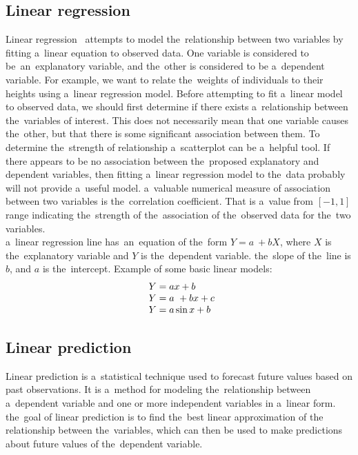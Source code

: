         \subsection{Linear regression}\label{sec:linear}
        Linear regression~\cite{Levinson} attempts to model the~relationship between two variables by fitting a~linear
        equation to observed data. One variable is considered to be~an~explanatory variable, and the~other is
        considered to be a~dependent variable. For example, we want to relate the~weights of individuals to their
        heights using a~linear regression model. Before attempting to fit a~linear model to observed data, we should
        first determine if there exists a~relationship between the~variables of interest. This does not necessarily
        mean that one variable causes the~other, but that there is some significant association between them.
        To determine the~strength of relationship a~scatterplot can be a~helpful tool.
        If there appears to be no association between the~proposed explanatory and dependent variables, then
        fitting a~linear regression model to the~data probably will not provide a~useful model.
        a~valuable numerical measure of association between two variables is the~correlation coefficient.
        That is a~value from $[-1, 1]$ range indicating the~strength of the~association of the~observed data
        for the~two variables.\\
        a~linear regression line has~an~equation of the~form $Y = a~+ bX$, where $X$ is the~explanatory variable
        and $Y$ is the~dependent variable. the~slope of the~line is $b$, and $a$ is the~intercept.
        Example of some basic linear models:\\
        \begin{equation} \label{eq:4}
        \begin{array}{l@{}l}
            Y = ax + b\\
            Y = a~+ bx + c\\
            Y = a\sin x + b\\
        \end{array}
        \end{equation}
        \subsection{Linear prediction}\label{subsec:lp}
        Linear prediction is a~statistical technique used to forecast future values based on past observations.
        It is a~method for modeling the~relationship between a~dependent variable and one or more independent
        variables in a~linear form. the~goal of linear prediction is to find the~best linear approximation of the
        relationship between the~variables, which can then be used to make predictions about future
        values of the~dependent variable.
